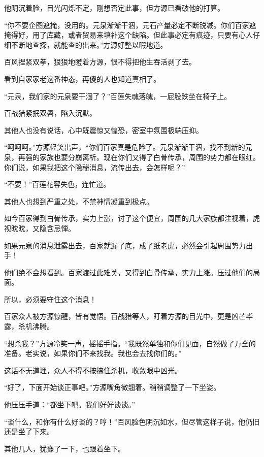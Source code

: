 
\begin{this_body}

他阴沉着脸，目光闪烁不定，刚想否定此事，但方源已看破他的打算。

“你不要企图遮掩，没用的。元泉渐渐干涸，元石产量必定不断锐减。你们百家遮掩得好，用了库藏，或者贸易来填补这个缺陷。但此事必定有痕迹，只要有心人仔细不断地查探，就能查的出来。”方源好整以暇地道。

百风捏紧双拳，狠狠地瞪着方源，恨不得把他生吞活剥了去。

看到自家家老这番神态，再傻的人也知道真相了。

“元泉，我们家的元泉要干涸了？”百莲失魂落魄，一屁股跌坐在椅子上。

百战猎紧抿双唇，陷入沉默。

其他人也没有说话，心中既震惊又惶恐，密室中氛围极端压抑。

“呵呵呵。”方源轻笑出声，“你们百家真是危险了。元泉渐渐干涸，找不到新的元泉，再强的家族也要分崩离析。现在你们又得了白骨传承，周围的势力都在眼红。你们说，如果我把这个隐秘消息，流传出去，会怎样呢？”

“不要！”百莲花容失色，连忙道。

其他人也想到严重之处，不禁神情凝重到极点。

如今百家得到白骨传承，实力上涨，讨了这个便宜，周围的几大家族都注视着，虎视眈眈，又隐含忌惮。

如果元泉的消息泄露出去，百家就漏了底，成了纸老虎，必然会引起周围势力出手！

他们绝不会想看到。百家渡过此难关，又得到白骨传承，实力上涨。压过他们的局面。

所以，必须要守住这个消息！

百家众人被方源惊醒，皆有觉悟。百战猎等人，盯着方源的目光中，更是凶芒毕露，杀机沸腾。

“想杀我？”方源冷笑一声，摇摇手指。“我既然单独和你们见面，自然做了万全的准备。老实说，如果你们不来找我。我也会去找你们的。”

这话不无道理，众人不得不按捺住杀机，收敛眼中凶光。

“好了，下面开始谈正事吧。”方源嘴角微翘着。稍稍调整了一下坐姿。

他压压手道：“都坐下吧。我们好好谈谈。”

“谈什么，和你有什么好谈的？哼！”百风脸色阴沉如水，但尽管这样子说，他仍旧还是坐了下来。

其他几人，犹豫了一下，也跟着坐下。


\end{this_body}
